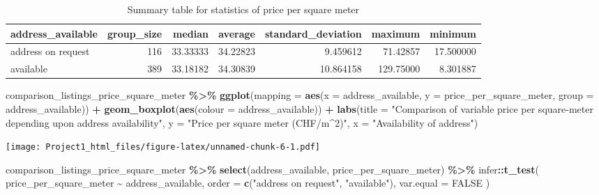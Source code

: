 \documentclass[
]{article}
\newenvironment{Shaded}{\begin{snugshade}}{\end{snugshade}}
\newcommand{\AttributeTok}[1]{\textcolor[rgb]{0.13,0.29,0.53}{#1}}
\newcommand{\ConstantTok}[1]{\textcolor[rgb]{0.56,0.35,0.01}{#1}}
\newcommand{\FunctionTok}[1]{\textcolor[rgb]{0.13,0.29,0.53}{\textbf{#1}}}
\newcommand{\NormalTok}[1]{#1}
\newcommand{\SpecialCharTok}[1]{\textcolor[rgb]{0.81,0.36,0.00}{\textbf{#1}}}
\newcommand{\StringTok}[1]{\textcolor[rgb]{0.31,0.60,0.02}{#1}}
\begin{document}
\begin{longtable}[l]{lrrrrrr}
\caption{\label{tab:unnamed-chunk-6}Summary table for statistics of price per square meter}\\
\toprule
address\_available & group\_size & median & average & standard\_deviation & maximum & minimum\\
\midrule
address on request & 116 & 33.33333 & 34.22823 & 9.459612 & 71.42857 & 17.500000\\
available & 389 & 33.18182 & 34.30839 & 10.864158 & 129.75000 & 8.301887\\
\bottomrule
\end{longtable}

\begin{Shaded}
\begin{Highlighting}[]
\NormalTok{comparison\_listings\_price\_square\_meter }\SpecialCharTok{\%\textgreater{}\%}
  \FunctionTok{ggplot}\NormalTok{(}\AttributeTok{mapping =} \FunctionTok{aes}\NormalTok{(}\AttributeTok{x =}\NormalTok{ address\_available,}
                                \AttributeTok{y =}\NormalTok{ price\_per\_square\_meter, }\AttributeTok{group =}
\NormalTok{                                  address\_available)) }\SpecialCharTok{+}
  \FunctionTok{geom\_boxplot}\NormalTok{(}\FunctionTok{aes}\NormalTok{(}\AttributeTok{colour =}\NormalTok{ address\_available)) }\SpecialCharTok{+}
  \FunctionTok{labs}\NormalTok{(}\AttributeTok{title =} \StringTok{"Comparison of variable price per square{-}meter}
\StringTok{       depending upon address availability"}\NormalTok{,}
       \AttributeTok{y =} \StringTok{"Price per square meter (CHF/m\^{}2)"}\NormalTok{,}
       \AttributeTok{x =} \StringTok{"Availability of address"}\NormalTok{)}
\end{Highlighting}
\end{Shaded}

\texttt{[image: Project1\_html\_files/figure-latex/unnamed-chunk-6-1.pdf]}

\begin{Shaded}
\begin{Highlighting}[]
\NormalTok{comparison\_listings\_price\_square\_meter }\SpecialCharTok{\%\textgreater{}\%} 
  \FunctionTok{select}\NormalTok{(address\_available, price\_per\_square\_meter) }\SpecialCharTok{\%\textgreater{}\%}
\NormalTok{  infer}\SpecialCharTok{::}\FunctionTok{t\_test}\NormalTok{(}
\NormalTok{    price\_per\_square\_meter }\SpecialCharTok{\textasciitilde{}}\NormalTok{ address\_available,}
    \AttributeTok{order =} \FunctionTok{c}\NormalTok{(}\StringTok{"address on request"}\NormalTok{, }\StringTok{"available"}\NormalTok{),}
    \AttributeTok{var.equal =} \ConstantTok{FALSE}
\NormalTok{  )}
\end{Highlighting}
\end{Shaded}
\end{document}
